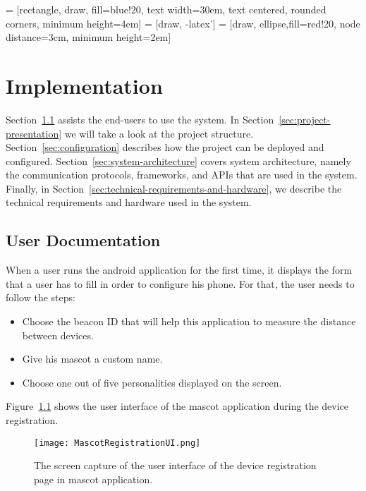  = [rectangle, draw, fill=blue!20,
text width=30em, text centered, rounded corners, minimum height=4em]
 = [draw, -latex']
 = [draw, ellipse,fill=red!20, node distance=3cm,
minimum height=2em]

\chapter{Implementation}
\label{ch:implementation}
Section~\ref{sec:user-documentation} assists the end-users to use the system.
In Section~\ref{sec:project-presentation} we will take a look at the project structure.
Section~\ref{sec:configuration} describes how the project can be deployed and configured.
Section~\ref{sec:system-architecture} covers system architecture, namely the
communication protocols, frameworks, and APIs that are used in the system.
Finally, in Section~\ref{sec:technical-requirements-and-hardware}, we describe the technical
requirements and hardware used in the system.

\section{User Documentation}
\label{sec:user-documentation}
When a user runs the android application for the first time, it displays the form that a
user has to fill in order to configure his phone.
For that, the user needs to follow the steps:

\begin{itemize}
    \item Choose the beacon ID that will help this application to measure the distance between devices.
    \item Give his mascot a custom name.
    \item Choose one out of five personalities displayed on the screen.
\end{itemize}

Figure~\ref{fig:MascotRegistrationUI} shows the user interface of the mascot application during the device registration.
\begin{figure}[hbt!]
    \centering
    \texttt{[image: MascotRegistrationUI.png]}
    \caption{The screen capture of the user interface of the device registration page in mascot application.}
    \label{fig:MascotRegistrationUI}
\end{figure}

